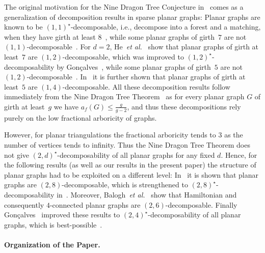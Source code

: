 \documentclass[a4paper,10pt]{article}
\theoremstyle{plain}
\begin{document}
The original motivation for the Nine Dragon Tree Conjecture in~\cite{Mon-12} comes as a generalization of decomposition results in sparse planar graphs: 
% 
Planar graphs are known to be $(1,1)^\star$-decomposable, i.e., decompose into a forest and a matching, when they have girth %
at least $8$~\cite{Wan-11,Mon-12}, while some planar graphs of girth~$7$ are not $(1,1)$-decomposable~\cite{Mon-12}.
% 
For $d=2$, He~\textit{et al.}~\cite{He-02} show that planar graphs of girth at least~$7$ are $(1,2)$-decomposable, which was improved to $(1,2)^\star$-decomposability by Gon\c{c}alves~\cite{Gon-09}, while some planar graphs of girth~$5$ are not $(1,2)$-decomposable~\cite{Mon-12}.
% 
In~\cite{He-02} it is further shown that planar graphs of girth at least~$5$ are $(1,4)$-decomposable.
% 
All these decomposition results follow immediately from the Nine Dragon Tree Theorem~\cite{Jia-16} as for every planar graph $G$ of girth at least~$g$ we have $a_f(G) \leq \frac{g}{g-2}$, and thus these decompositions rely purely on the low fractional arboricity of graphs.

However, for planar triangulations the fractional arboricity tends to $3$ as the number of vertices tends to infinity.
Thus the Nine Dragon Tree Theorem does not give $(2,d)^\star$-decomposability of all planar graphs for any fixed $d$.
Hence, for the following results (as well as our results in the present paper) the structure of planar graphs had to be exploited on a different level:
In~\cite{He-02} it is shown that planar graphs are $(2,8)$-decomposable, which is strengthened to $(2,8)^\star$-decomposability in~\cite{Bal-05}.
Moreover, Balogh~\textit{et al.}~\cite{Bal-05} show that Hamiltonian and consequently $4$-connected planar graphs are $(2,6)$-decomposable.
Finally Gon\c{c}alves~\cite{Gon-09} improved these results to $(2,4)^\star$-decomposability of all planar graphs, which is best-possible~\cite{Bal-05}.




\paragraph{Organization of the Paper.}
\end{document}
